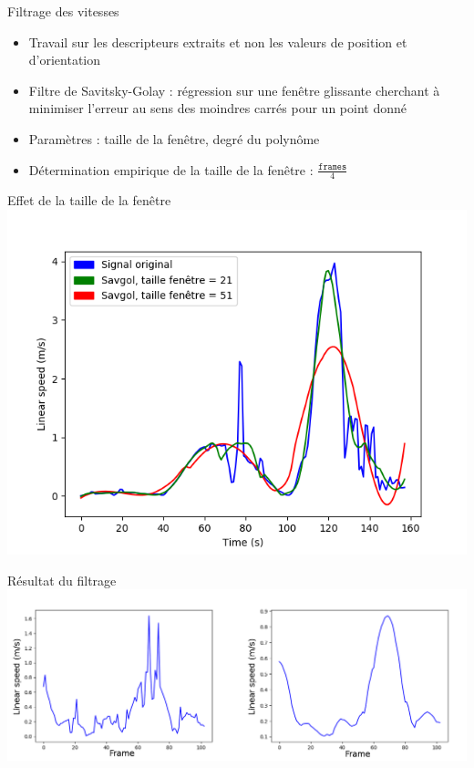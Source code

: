 \documentclass[svgnames]{beamer}
\begin{document}
	\begin{frame}{Filtrage des vitesses}
		\begin{itemize}[label=$\bullet$]
			\item Travail sur les descripteurs extraits et non les valeurs de position et d'orientation
			\item Filtre de Savitsky-Golay : régression sur une fenêtre glissante cherchant à minimiser l'erreur au sens des moindres carrés pour un point donné 
			\item Paramètres : taille de la fenêtre, degré du polynôme	
			\item Détermination empirique de la taille de la fenêtre : $\frac{\texttt{frames}}{4}$ 	
		\end{itemize}
	\end{frame}
	
	\begin{frame}{Effet de la taille de la fenêtre}
	\centering
		\includegraphics[scale=0.6]{img/savgol_comparison_all_3_at_once.png}
	
	\end{frame}
	
	\begin{frame}{Résultat du filtrage}
	\centering
		\includegraphics[scale=0.4]{img/before_after_savgol.png}
	\end{frame}
	
\end{document}
